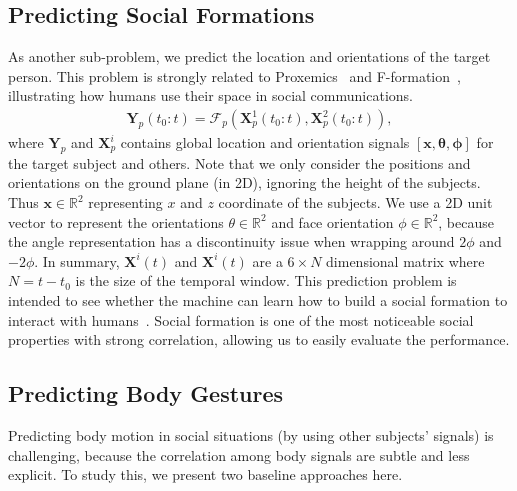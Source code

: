 \subsection{Predicting Social Formations}
As another sub-problem, we predict the location and orientations of the target person. This problem is strongly related to Proxemics~\cite{Hall66} and F-formation~\cite{kendon90}, illustrating how humans use their space in social communications.
\begin{gather}	
 \mathbf{Y}_p (t_0:t) = \mathcal{F}_p ( \mathbf{X}_p^1(t_0:t), \mathbf{X}_p^2(t_0:t)),
 \label{eq:pred_formation}
\end{gather}
where $\mathbf{Y}_p$ and $\mathbf{X}_p^i$ contains global location and orientation signals $[\mathbf{x}, \boldsymbol{\theta}, \boldsymbol{\phi} ]$ for the target subject and others.
Note that we only consider the positions and orientations on the ground plane (in 2D), ignoring the height of the subjects. Thus $\mathbf{x} \in \mathbb{R}^2 $ representing $x$ and $z$ coordinate of the subjects. We use a 2D unit vector to represent the orientations $\theta \in \mathbb {R}^2$ and face orientation $\phi \in \mathbb{R}^2$, because the angle representation has a discontinuity issue when wrapping around $2\phi$ and $-2\phi$. In summary, $\mathbf{X}^i(t)$ and $\mathbf{X}^i(t)$ are a $6 \times N$ dimensional matrix where $N = t- t_0$ is the size of the temporal window. This prediction problem is intended to see whether the machine can learn how to build a social formation to interact with humans~\cite{vazquez2017towards}. Social formation is one of the most noticeable social properties with strong correlation, allowing us to easily evaluate the performance.



\subsection{Predicting Body Gestures}
Predicting body motion in social situations (by using other subjects' signals) is challenging, because the correlation among body signals are subtle and less explicit. To study this, we present two baseline approaches here. 


